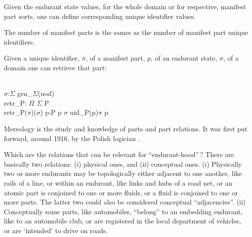 
\begynd
\pind Given the endurant state values, 
\begynd
\pind for the whole domain or 
\pind for respective, manifest part sorts,
\afslut
\pind one can define corresponding unique identifier values.
\afslut



\begynd
\pind The number of manifest parts
\pind is the sames as 
\pind the number of manifest part unique identifiers.
\afslut


\label{intq-retr}

\begynd
\pind Given a unique identifier, $\pi$, 
\pind of a manifest part, $p$, 
\pind of an endurant state, $\sigma$, of a domain 
\pind one can retrieve that part:
\afslut

\bp
\>\>\\
\>\>\>\>$\sigma$:$\Sigma$ {\EQ} gen\_$\Sigma$(uod)\\
\>\>\>\>retr\_P: $\Pi$ {\RIGHTARROW} $\Sigma$ {\RIGHTARROW} P\\
\>\>\>\>retr\_P($\pi$)($\sigma$) {\IS}  p:P {\RDOT} p {\ISIN} $\sigma$ {\WEDGE} uid\_P(p){\EQ}$\pi$  p 
\ep


\label{Mereology}

\begynd
\pind Mereology is the study and knowledge of parts and part relations.
\pind It was first put forward, around 1916, by the Polish logician
 \cite{Lesniewski1920s,CasatiVarzi1999}. 
\afslut

\begynd
\pind Which are the relations that can be relevant for ``endurant-hood''\,? 
\pind There are basically two relations: (i) physical ones, and (ii) conceptual ones.
\begynd
\pind (i) Physically two or more endurants 
\begynd
\pind may be topologically either adjacent to one another,
\begynd
\pind like rails of a line, or within an endurant, 
\pind like links and hubs of a road net, 
\pind or an atomic part is conjoined to one or more fluids, 
\pind or a fluid is conjoined to one or more parts.
\afslut 
\pind The latter two could also be considered conceptual ``adjacencies''.
\afslut
\pind (ii) Conceptually some parts, 
\begynd
\pind like automobiles, ``belong'' to an embedding endurant, 
\pind like to an automobile club, 
\pind or are registered in the local department of vehicles, 
\pind or are ‘intended’
to drive on roads.
\afslut
\afslut

